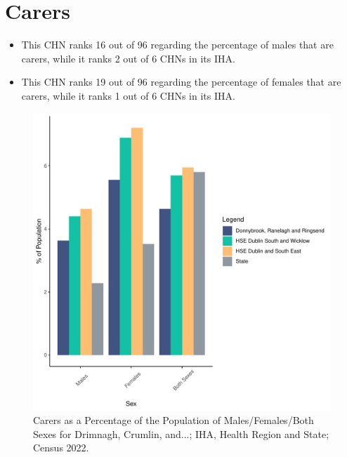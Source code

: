 \documentclass{article}
\begin{document}
\section{Carers}\label{sect:Carers}
\begin{itemize}
\item This CHN ranks  16 out of 96 regarding the percentage of males that are carers, while it ranks   2 out of 6 CHNs in its IHA.
\item This CHN ranks  19 out of 96 regarding the percentage of females that are carers, while it ranks   1 out of 6 CHNs in its IHA.
\end{itemize}
\begin{figure}[H]
	\centering
	\includegraphics[width = 150mm]{../figures/CareED.pdf}
	\caption{Carers as a Percentage of the Population of Males/Females/Both Sexes for Drimnagh, Crumlin, and...; IHA, Health Region and State; Census 2022.}
	\label{fig:2ae19629-1a6a-13a3-e055-000000000001}
	\end{figure}
\end{document}
